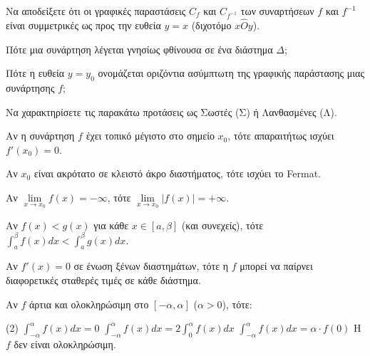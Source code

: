\documentclass[11pt,a4paper]{article}
\newcommand{\kerkissans}[1]{{\fontfamily{maksf}\selectfont \textbf{#1}}}
\renewcommand{\textdexiakeraia}{}
\newcommand{\dint}{\displaystyle\int}
\newcommand\themanum{A}
\newcounter{thema}[section]
\renewcommand{\thethema}{\arabic{thema}}
\newcommand{\Thema}{\refstepcounter{thema}{\textbf{\textcolor{black}{\faPenSquare\ \  \large \kerkissans{\textbf{\thethemaο\hspace{2mm}Διαγώνισμα - Θέμα \themanum}}}}}\hspace{0mm}}{}
\newenvironment{thema}[1]
{\begin{tcolorbox}[title=\Thema\kerkissans{\textbf{\large{  #1}}},breakable,
enhanced standard,titlerule=0pt,toprule=0pt, rightrule=0pt, bottomrule=0pt,
colback=white,left=0mm,top=1mm,bottom=0mm,
boxrule=0pt,
colframe=white,leftrule=0mm,sharp corners,coltitle=black]
\renewcommand{\themanum}{#1}}
{\end{tcolorbox}}
\newcommand{\eng}[1]{\selectlanguage{english}#1\selectlanguage{greek}}
\begin{document}
\begin{thema}{A}
\begin{erwthma}
    \item Να αποδείξετε ότι οι γραφικές παραστάσεις $ C_f $ και $ C_{f^{-1}} $ των συναρτήσεων $ f $ και $ f^{-1} $ είναι συμμετρικές ως προς την ευθεία $ y=x $ (διχοτόμο $x\hat{O}y$).
    \item Πότε μια συνάρτηση λέγεται γνησίως φθίνουσα σε ένα διάστημα $\Delta$;
    \item Πότε η ευθεία $y=y_0$ ονομάζεται οριζόντια ασύμπτωτη της γραφικής παράστασης μιας συνάρτησης $f$;
    \item Να χαρακτηρίσετε τις παρακάτω προτάσεις ως Σωστές (Σ) ή Λανθασμένες (Λ).
    \begin{alist}
        \item Αν η συνάρτηση $f$ έχει τοπικό μέγιστο στο σημείο $x_0$, τότε απαραιτήτως ισχύει $f'(x_0) = 0$.
        \item Αν $x_0$ είναι ακρότατο σε κλειστό άκρο διαστήματος, τότε ισχύει το \eng{Fermat}.
        \item Αν $\lim\limits_{x\to x_0} f(x) = -\infty$, τότε $\lim\limits_{x\to x_0} |f(x)| = +\infty$.
        \item Αν $f(x) < g(x)$ για κάθε $x \in [a, \beta]$ (και συνεχείς), τότε $\dint_a^\beta f(x) dx < \dint_a^\beta g(x) dx$.
        \item Αν $f'(x) = 0$ σε ένωση ξένων διαστημάτων, τότε η $f$ μπορεί να παίρνει διαφορετικές σταθερές τιμές σε κάθε διάστημα.
    \end{alist}
    \item Αν $f$ άρτια και ολοκληρώσιμη στο $[-\alpha, \alpha]$ ($\alpha > 0$), τότε:
    \begin{tasks}[label=\let\textdexiakeraia\relax\alph*.](2)
        \task $\dint_{-\alpha}^{\alpha} f(x) dx = 0$
        \task $\dint_{-\alpha}^{\alpha} f(x) dx = 2\dint_0^{\alpha} f(x) dx$
        \task $\dint_{-\alpha}^{\alpha} f(x) dx = \alpha \cdot f(0)$
        \task H $f$ δεν είναι ολοκληρώσιμη.
    \end{tasks}
\end{erwthma}
\end{thema}
\vspace{1cm}
\end{document}
